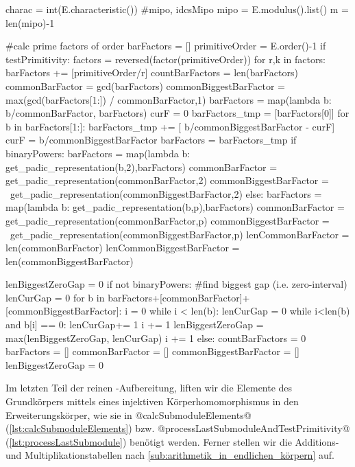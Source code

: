 \begin{sagecode}[caption={\texttt{countCompleteSubmoduleGenerators}
  Fortsetzung (I)}]
    charac = int(E.characteristic())
        #mipo, idcsMipo
    mipo = E.modulus().list()
    m = len(mipo)-1

    #calc prime factors of order
    barFactors = []
    primitiveOrder = E.order()-1
    if testPrimitivity:
        factors = reversed(factor(primitiveOrder))
        for r,k in factors:
            barFactors += [primitiveOrder/r]
        countBarFactors = len(barFactors)
        commonBarFactor = gcd(barFactors)
        commonBiggestBarFactor = max(gcd(barFactors[1:]) / commonBarFactor,1)
        barFactors = map(lambda b: b/commonBarFactor, barFactors)
        curF = 0
        barFactors_tmp = [barFactors[0]]
        for b in barFactors[1:]:
            barFactors_tmp += [ b/commonBiggestBarFactor - curF]
            curF = b/commonBiggestBarFactor
        barFactors = barFactors_tmp
        if binaryPowers:
            barFactors = map(lambda b: get_padic_representation(b,2),barFactors)
            commonBarFactor = get_padic_representation(commonBarFactor,2)
            commonBiggestBarFactor = \
                    get_padic_representation(commonBiggestBarFactor,2)
        else:
            barFactors = map(lambda b: get_padic_representation(b,p),barFactors)
            commonBarFactor = get_padic_representation(commonBarFactor,p)
            commonBiggestBarFactor = \
                    get_padic_representation(commonBiggestBarFactor,p)
        lenCommonBarFactor = len(commonBarFactor)
        lenCommonBiggestBarFactor = len(commonBiggestBarFactor)

        lenBiggestZeroGap = 0
        if not binaryPowers:
            #find biggest gap (i.e. zero-interval)
            lenCurGap = 0
            for b in barFactors+[commonBarFactor]+[commonBiggestBarFactor]:
                i = 0
                while i < len(b):
                    lenCurGap = 0
                    while i<len(b) and b[i] == 0:
                        lenCurGap+= 1
                        i += 1
                    lenBiggestZeroGap = max(lenBiggestZeroGap, lenCurGap)
                    i += 1
    else:
        countBarFactors = 0
        barFactors = []
        commonBarFactor = []
        commonBiggestBarFactor = []
        lenBiggestZeroGap = 0
\end{sagecode}


Im letzten Teil der reinen \sage-Aufbereitung, liften wir die Elemente des
Grundkörpers mittels eines injektiven Körperhomomorphismus in den
Erweiterungskörper, wie sie in @calcSubmoduleElements@
(\autoref{lst:calcSubmoduleElements}) bzw.
@processLastSubmoduleAndTestPrimitivity@
(\autoref{lst:processLastSubmodule}) benötigt werden. Ferner stellen wir die 
Additions- und Multiplikationstabellen nach 
\autoref{sub:arithmetik_in_endlichen_körpern} auf.

